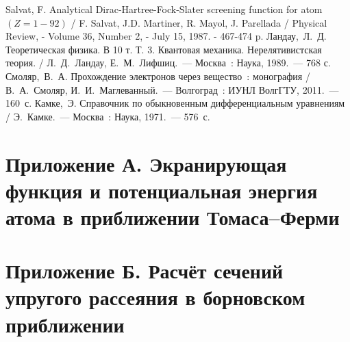 \clearpage
\renewcommand{\refname}{СПИСОК ИСПОЛЬЗОВАННЫХ ИСТОЧНИКОВ}
\begin{thebibliography}{10}
 Salvat, F. Analytical Dirac-Hartree-Fock-Slater screening
function for atom $(Z=1-92)$ / F. Salvat, J.D. Martiner, R. Mayol, J.
Parellada / Physical Review, - Volume 36, Number 2, - July 15, 1987. -
467-474 p.
 Ландау,~Л.~Д. Теоретическая физика. В 10 т. Т. 3. Квантовая механика. Нерелятивистская теория. / Л.~Д.~Ландау, Е.~М.~Лифшиц.~--- Москва~: Наука, 1989.~--- 768 с.
 Смоляр,~В.~А. Прохождение электронов через вещество~: монография / В.~А.~Смоляр, И.~И.~Маглеванный.~--- Волгоград~: ИУНЛ ВолгГТУ, 2011.~--- 160~с.
 Камке,~Э. Справочник по обыкновенным дифференциальным
уравнениям / Э.~Камке.~--- Москва~: Наука, 1971.~--- 576~с.

\end{thebibliography}
\newpage
{}
\section*{Приложение А. Экранирующая функция и потенциальная энергия атома в
приближении Томаса--Ферми}


  \vspace{1.5em}
  
\newpage
{}
\section*{Приложение Б. Расчёт сечений упругого рассеяния в борновском
    приближении}
  \label{sec:code}
  


